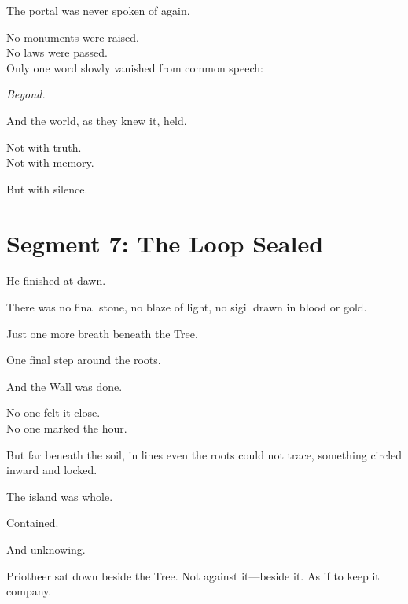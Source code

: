 \documentclass[9pt]{article}
\begin{document}
\vspace{0.5em}
The portal was never spoken of again.

\vspace{0.5em}
No monuments were raised.\\
No laws were passed.\\
Only one word slowly vanished from common speech:

\vspace{0.5em}
\textit{Beyond.}

\vspace{0.5em}
And the world, as they knew it, held.

\vspace{0.5em}
Not with truth.\\
Not with memory.

\vspace{0.5em}
But with silence.

\newpage

\section*{Segment 7: The Loop Sealed}

He finished at dawn.

\vspace{0.5em}
There was no final stone, no blaze of light, no sigil drawn in blood or gold.

\vspace{0.5em}
Just one more breath beneath the Tree.

\vspace{0.5em}
One final step around the roots.

\vspace{0.5em}
And the Wall was done.

\vspace{0.5em}
No one felt it close.\\
No one marked the hour.

\vspace{0.5em}
But far beneath the soil, in lines even the roots could not trace, something circled inward and locked.

\vspace{0.5em}
The island was whole.

\vspace{0.5em}
Contained.

\vspace{0.5em}
And unknowing.

\vspace{0.5em}
Priotheer sat down beside the Tree. Not against it---beside it. As if to keep it company.
\end{document}
